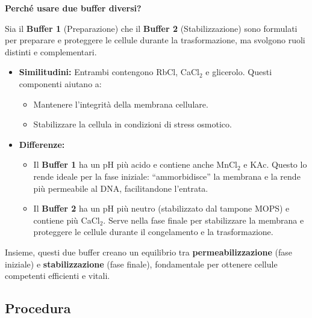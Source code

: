 \begin{percheBox}
  \textbf{Perché usare due buffer diversi?}

  Sia il \textbf{Buffer 1} (Preparazione) che il \textbf{Buffer 2} (Stabilizzazione) sono formulati per preparare e proteggere le cellule durante la trasformazione, ma svolgono ruoli distinti e complementari.

  \begin{itemize}\footnotesize
    \item \textbf{Similitudini:} Entrambi contengono RbCl, CaCl$_2$ e glicerolo. Questi componenti aiutano a:
      \begin{itemize}
        \item Mantenere l’integrità della membrana cellulare.
        \item Stabilizzare la cellula in condizioni di stress osmotico.
      \end{itemize}

    \item \textbf{Differenze:}
      \begin{itemize}
        \item Il \textbf{Buffer 1} ha un pH più acido e contiene anche MnCl$_2$ e KAc. Questo lo rende ideale per la fase iniziale: “ammorbidisce” la membrana e la rende più permeabile al DNA, facilitandone l’entrata.
        \item Il \textbf{Buffer 2} ha un pH più neutro (stabilizzato dal tampone MOPS) e contiene più CaCl$_2$. Serve nella fase finale per stabilizzare la membrana e proteggere le cellule durante il congelamento e la trasformazione.
      \end{itemize}
  \end{itemize}

  Insieme, questi due buffer creano un equilibrio tra \textbf{permeabilizzazione} (fase iniziale) e \textbf{stabilizzazione} (fase finale), fondamentale per ottenere cellule competenti efficienti e vitali.
\end{percheBox}

\newpage
\subsection{Procedura}

